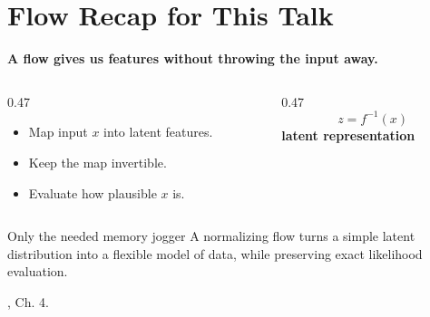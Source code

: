\documentclass[fleqn,compress,utf8,aspectratio=169,t]{beamer}
\makeatletter
\newcommand{\mainclaim}[1]{%
  {\Large\bfseries #1\par}
}
\newcommand{\quietsource}[1]{%
  \vfill{\scriptsize\color{lmu@lightgray}#1\par}
}
\newcommand{\keyword}[1]{\textbf{\color{lmu@green}#1}}
\makeatother
\begin{document}
\section{Flow Recap for This Talk}
\begin{frame}
  \mainclaim{A flow gives us features without throwing the input away.}

  \vspace{0.55cm}
  \begin{columns}[c,totalwidth=\textwidth]
    \begin{column}{0.47\textwidth}
      \begin{itemize}
        \item Map input \(x\) into latent features.
        \item Keep the map invertible.
        \item Evaluate how plausible \(x\) is.
      \end{itemize}
    \end{column}
    \begin{column}{0.47\textwidth}
      \centering
      {\Large
      \[
        z=f^{-1}(x)
      \]
      }
      \vspace{0.1cm}
      \keyword{latent representation}
    \end{column}
  \end{columns}

  \vspace{0.45cm}
  \begin{block}{Only the needed memory jogger}
    A normalizing flow turns a simple latent distribution into a flexible model of data,
    while preserving exact likelihood evaluation.
  \end{block}

  \quietsource{\textcite{tomczak2024deep}, Ch. 4.}
\end{frame}

\end{document}
